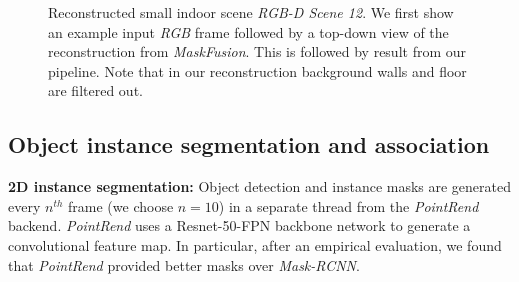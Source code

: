 \begin{figure}[t!]
    \centering
    \vspace{-2mm}
    \caption{Reconstructed small indoor scene \emph{RGB-D Scene 12}. We first show an example input \textit{RGB} frame followed by a top-down view of the reconstruction from \textit{MaskFusion}. This is followed by result from our pipeline. Note that in our reconstruction background walls and floor are filtered out. }
    \vspace*{-1em}
    \label{fig:rgbd_scene12}
\end{figure}


\subsection{Object instance segmentation and association} \label{subsec: segmentation}

\textbf{2D instance segmentation:} Object detection and instance masks are generated every $n^{th}$ frame (we choose $n=10$) in a separate thread from the \textit{PointRend} backend. \textit{PointRend} uses a Resnet-50-FPN backbone network to generate a convolutional feature map. In particular, after an empirical evaluation, we found that \textit{PointRend} provided better masks over \textit{Mask-RCNN}.


